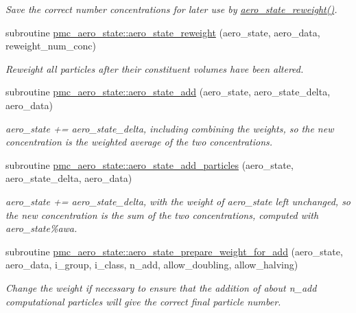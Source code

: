 \begin{DoxyCompactItemize}
\begin{DoxyCompactList}\small\item\em Save the correct number concentrations for later use by \mbox{\hyperlink{namespacepmc__aero__state_a38c69c82e0dbc601557ff505d0513ba6}{aero\+\_\+state\+\_\+reweight()}}. \end{DoxyCompactList}\item 
subroutine \mbox{\hyperlink{namespacepmc__aero__state_a38c69c82e0dbc601557ff505d0513ba6}{pmc\+\_\+aero\+\_\+state\+::aero\+\_\+state\+\_\+reweight}} (aero\+\_\+state, aero\+\_\+data, reweight\+\_\+num\+\_\+conc)
\begin{DoxyCompactList}\small\item\em Reweight all particles after their constituent volumes have been altered. \end{DoxyCompactList}\item 
subroutine \mbox{\hyperlink{namespacepmc__aero__state_ad9c12bba90caa58b86882ebfe4a4335c}{pmc\+\_\+aero\+\_\+state\+::aero\+\_\+state\+\_\+add}} (aero\+\_\+state, aero\+\_\+state\+\_\+delta, aero\+\_\+data)
\begin{DoxyCompactList}\small\item\em {\ttfamily aero\+\_\+state += aero\+\_\+state\+\_\+delta}, including combining the weights, so the new concentration is the weighted average of the two concentrations. \end{DoxyCompactList}\item 
subroutine \mbox{\hyperlink{namespacepmc__aero__state_a9960460ba28e89f4f253dcbdb482fff7}{pmc\+\_\+aero\+\_\+state\+::aero\+\_\+state\+\_\+add\+\_\+particles}} (aero\+\_\+state, aero\+\_\+state\+\_\+delta, aero\+\_\+data)
\begin{DoxyCompactList}\small\item\em {\ttfamily aero\+\_\+state += aero\+\_\+state\+\_\+delta}, with the weight of {\ttfamily aero\+\_\+state} left unchanged, so the new concentration is the sum of the two concentrations, computed with {\ttfamily aero\+\_\+state\%awa}. \end{DoxyCompactList}\item 
subroutine \mbox{\hyperlink{namespacepmc__aero__state_af3652445ddd2485a544cc426b3248481}{pmc\+\_\+aero\+\_\+state\+::aero\+\_\+state\+\_\+prepare\+\_\+weight\+\_\+for\+\_\+add}} (aero\+\_\+state, aero\+\_\+data, i\+\_\+group, i\+\_\+class, n\+\_\+add, allow\+\_\+doubling, allow\+\_\+halving)
\begin{DoxyCompactList}\small\item\em Change the weight if necessary to ensure that the addition of about {\ttfamily n\+\_\+add} computational particles will give the correct final particle number. \end{DoxyCompactList}\item 

\end{DoxyCompactItemize}
